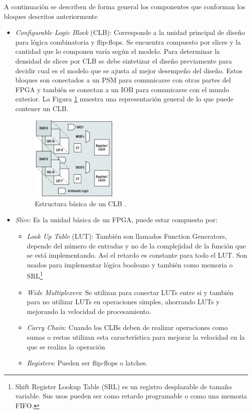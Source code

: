 A continuación se describen de forma general los componentes que conforman los bloques descritos anteriormente \citep{xilinx2,xilinx4}
\begin{itemize}

\item \textit{Configurable Logic Block} (CLB): Corresponde a la unidad principal de diseño para lógica combinatoria y flip-flops. Se encuentra compuesto por slices y la cantidad que lo componen varía según el modelo. Para determinar la densidad de slices por CLB se debe sintetizar el diseño previamente para decidir cual es el modelo que se ajusta al mejor desempeño del diseño. Estos bloques son conectados a un PSM para comunicarse con otras partes del FPGA y también se conectan a un IOB para comunicarse con el mundo exterior. La Figura \ref{figEstructuraCLB} muestra una representación general de lo que puede contener un CLB.

\begin{figure}
	\centering
	\includegraphics[width=0.4\textwidth]{./images/figEstructuraCLB}
	\caption{Estructura básica de un CLB \citep{xilinx5}.}
	\label{figEstructuraCLB}
\end{figure}

\item \textit{Slice}: Es la unidad básica de un FPGA, puede estar compuesto por:

\begin{itemize}
\item \textit{Look Up Table} (LUT): También son llamados Function Generators, depende del número de entradas y no de la complejidad de la función que se está implementando. Así el retardo es constante para todo el LUT. Son usados para implementar lógica booleano y también como memoria o SRL\footnote{Shift Register Lookup Table (SRL) es un registro desplazable de tamaño variable. Sus usos pueden ser como retardo programable o como una memoria FIFO.}

\item \textit{Wide Multiplexers}: Se utilizan para conectar LUTs entre si y también para no utilizar LUTs en operaciones simples, ahorrando LUTs y mejorando la velocidad de procesamiento. 
\item \textit{Carry Chain}: Cuando los CLBs deben de realizar operaciones como sumas o restas utilizan esta característica para mejorar la velocidad en la que se realiza la operación
\item \textit{Registers}: Pueden ser flip-flops o latches.
\end{itemize}


\end{itemize}
